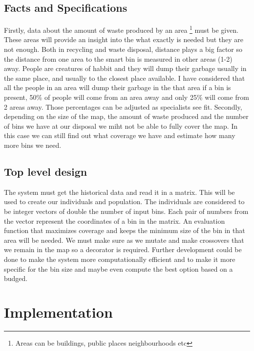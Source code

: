 \documentclass[a4paper,12pt]{report}
\begin{document}
\section {Facts and Specifications}
Firstly, data about the amount of waste produced by an area \footnote{Areas can be buildings, public places neighbourhoods etc} must be given. These areas will provide an insight into the what exactly is needed but they are not enough.
Both in recycling and waste disposal, distance plays a big factor\cite{castro2017smart} so the distance from one area to the smart bin is measured in other areas (1-2) away. People are creatures of habbit and they will dump their garbage usually in the same place, and usually to the closest place available. I have considered that all the people in an area will dump their garbage in the that area if a bin is present, 50\% of people will come from an area away and only 25\% will come from 2 areas away. Those percentages can be adjusted as specialists see fit.
Secondly, depending on the size of the map, the amount of waste produced and the number of bins we have at our disposal we miht not be able to fully cover the map. In this case we can still find out what coverage we have and estimate how many more bins we need.

\section {Top level design}
The system must get the historical data and read it in a matrix. This will be used to create our individuals and population. The individuals are considered to be integer vectors of double the number of input bins. Each pair of numbers from the vector represent the coordinates of a bin in the matrix. An evaluation function that maximizes coverage and keeps the minimum size of the bin in that area will be needed. We must make sure as we mutate and make crossovers that we remain in the map so a decorator is required.
Further development could be done to make the system more computationally efficient and to make it more specific for the bin size and maybe even compute the best option based on a budged.

\chapter{Implementation}
\end{document}
